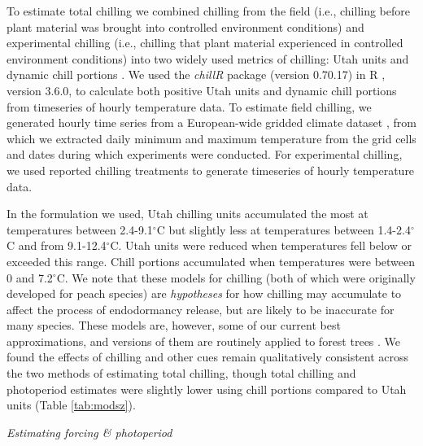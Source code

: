 \documentclass{article}
\begin{document}
\par To estimate total chilling we combined chilling from the field (i.e., chilling before plant material was brought into controlled environment conditions) and experimental chilling (i.e., chilling that plant material experienced in controlled environment conditions) into two widely used metrics of chilling: Utah units and dynamic chill portions \citep{dennis2003}. We used the \textit{chillR} package (version 0.70.17) in R \citep{Rcore:2017, chillR2019}, version 3.6.0, to calculate both positive Utah units and dynamic chill portions from timeseries of hourly temperature data. To estimate field chilling, we generated hourly time series from a European-wide gridded climate dataset \citep{cornes2018}, from which we extracted daily minimum and maximum temperature from the grid cells and dates during which experiments were conducted. For experimental chilling, we used reported chilling treatments to generate timeseries of hourly temperature data.
\par In the formulation we used, Utah chilling units accumulated the most at temperatures between 2.4-9.1$^{\circ}$C but slightly less at temperatures between 1.4-2.4$^{\circ}$C and from 9.1-12.4$^{\circ}$C. Utah units were reduced when temperatures fell below or exceeded this range. Chill portions accumulated when temperatures were between 0 and 7.2$^{\circ}$C. We note that these models for chilling (both of which were originally developed for peach species) are \emph{hypotheses} for how chilling may accumulate to affect the process of endodormancy release, but are likely to be inaccurate for many species. These models are, however, some of our current best approximations, and versions of them are routinely applied to forest trees \citep[e.g.,][]{Harrington:2010}. We found the effects of chilling and other cues remain qualitatively consistent across the two methods of estimating total chilling, though total chilling and photoperiod estimates were slightly lower using chill portions compared to Utah units (Table \ref{tab:modsz}).

\par{\emph{Estimating forcing \& photoperiod}}
\end{document}
